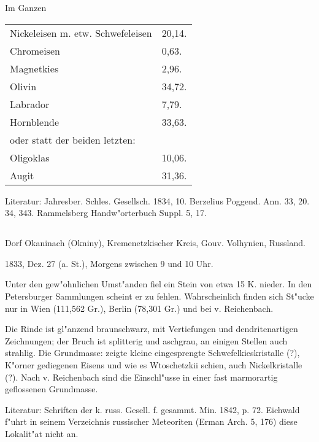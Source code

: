 \documentclass[a4paper, 11pt, oneside]{article}
\begin{document}
\begin{center}
Im Ganzen
\end{center}
\begin{table}[H]
    \centering\swabfamily\Large
    \begin{tabular}{l l}
        Nickeleisen m. etw. Schwefeleisen & 20,14. \\
        Chromeisen & 0,63. \\
        Magnetkies & 2,96. \\
        Olivin & 34,72. \\
        Labrador & 7,79. \\
        Hornblende & 33,63. \\
        oder statt der beiden letzten:  &  \\
        Oligoklas & 10,06. \\
        Augit & 31,36. \\
    \end{tabular}
\end{table}

\normalsize
Literatur: Jahresber. Schles. Gesellsch. 1834, 10. Berzelius Poggend. Ann. 33, 20. 34, 343. Rammelsberg Handw"orterbuch Suppl. 5, 17.

\subsection{}
\LARGE
\paragraph{}
Dorf Okaninach (Okniny), Kremenetzkischer Kreis, Gouv. Volhynien, Russland.

1833, Dez. 27 (a. St.), Morgens zwischen 9 und 10 Uhr.

Unter den gew"ohnlichen Umst"anden fiel ein Stein von etwa 15 K. nieder. In den Petersburger Sammlungen scheint er zu fehlen. Wahrscheinlich finden sich St"ucke nur in Wien (111,562 Gr.), Berlin (78,301 Gr.) und bei v. Reichenbach.

Die Rinde ist gl"anzend braunschwarz, mit Vertiefungen und dendritenartigen Zeichnungen; der Bruch ist splitterig und aschgrau, an einigen Stellen auch strahlig. Die Grundmasse: zeigte kleine eingesprengte Schwefelkieskristalle (?), K"orner gediegenen Eisens und wie es Wtoschetzkii schien, auch Nickelkristalle (?). Nach v. Reichenbach sind die Einschl"usse in einer fast marmorartig geflossenen Grundmasse.

\normalsize
Literatur: Schriften der k. russ. Gesell. f. gesammt. Min. 1842, p. 72. Eichwald f"uhrt in seinem Verzeichnis russischer Meteoriten (Erman Arch. 5, 176) diese Lokalit"at nicht an.
\end{document}
